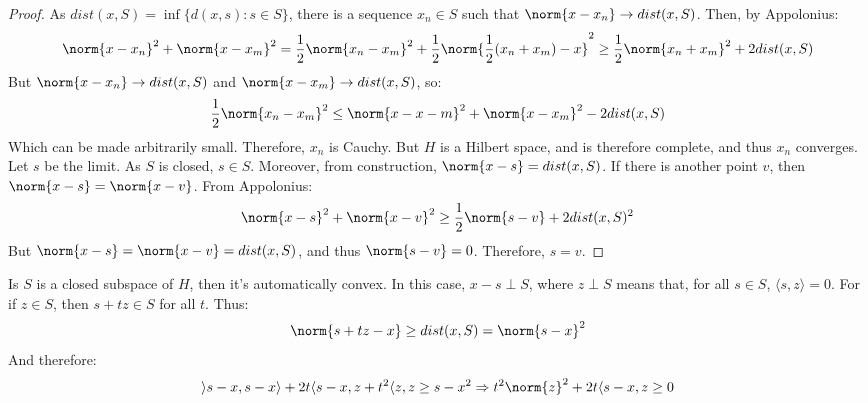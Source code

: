 \documentclass[crop=false,class=book,oneside]{standalone}
\begin{document}
            \begin{proof}
                As $dist(x,S)=\inf\{d(x,s):s\in{S}\}$, there is
                a sequence $x_{n}\in{S}$ such that
                $\norm{x-x_{n}}\rightarrow{dist(x,S)}$. Then, by
                Appolonius:
                \begin{equation*}
                    \norm{x-x_{n}}^{2}+\norm{x-x_{m}}^{2}
                    =\frac{1}{2}\norm{x_{n}-x_{m}}^{2}
                    +\frac{1}{2}\norm{\frac{1}{2}(x_{n}+x_{m})-x}^{2}
                    \geq\frac{1}{2}\norm{x_{n}+x_{m}}^{2}
                    +2dist(x,S)
                \end{equation*}
                But $\norm{x-x_{n}}\rightarrow{dist(x,S)}$ and
                $\norm{x-x_{m}}\rightarrow{dist(x,S)}$, so:
                \begin{equation*}
                    \frac{1}{2}\norm{x_{n}-x_{m}}^{2}
                    \leq\norm{x-x-{m}}^{2}
                    +\norm{x-x_{m}}^{2}-2dist(x,S)
                \end{equation*}
                Which can be made arbitrarily small. Therefore,
                $x_{n}$ is Cauchy. But $H$ is a Hilbert space, and
                is therefore complete, and thus $x_{n}$ converges.
                Let $s$ be the limit. As $S$ is closed, $s\in{S}$.
                Moreover, from construction,
                $\norm{x-s}=dist(x,S)$. If there is another point
                $v$, then $\norm{x-s}=\norm{x-v}$. From
                Appolonius:
                \begin{equation*}
                    \norm{x-s}^{2}+\norm{x-v}^{2}
                    \geq\frac{1}{2}\norm{s-v}+2dist(x,S)^{2}
                \end{equation*}
                But $\norm{x-s}=\norm{x-v}=dist(x,S)$, and
                thus $\norm{s-v}=0$. Therefore, $s=v$.
            \end{proof}
            Is $S$ is a closed subspace of $H$, then it's
            automatically convex. In this case, $x-s\perp{S}$,
            where $z\perp{S}$ means that, for all
            $s\in{S}$, $\langle{s,z}\rangle=0$. For if
            $z\in{S}$, then $s+tz\in{S}$ for all $t$. Thus:
            \begin{equation*}
                \norm{s+tz-x}\geq{dist(x,S)}=\norm{s-x}^{2}
            \end{equation*}
            And therefore:
            \begin{equation*}
                \rangle{s-x,s-x}\rangle+2t\langle{s-x,z}
                +t^{2}\langle{z,z}\geq{s-x}^{2}
                \Rightarrow{t^{2}\norm{z}^{2}+2t\langle{s-x,z}}
                \geq{0}
            \end{equation*}
\end{document}
